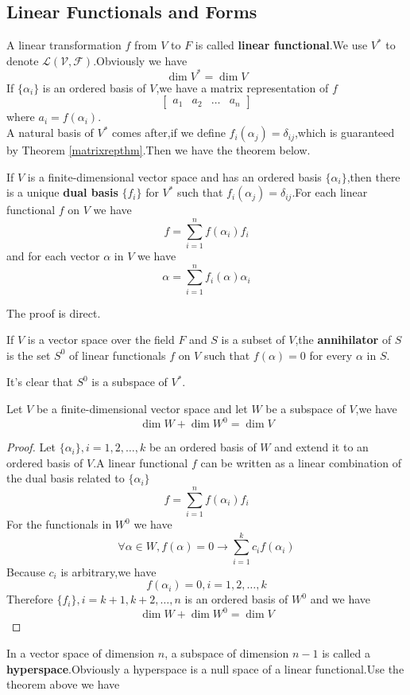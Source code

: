 \documentclass{article}
\begin{document}
\subsection{Linear Functionals and Forms}
A linear transformation $f$ from $V$ to $F$ is called \textbf{linear functional}.We use $V^*$ to denote $\mathcal{L(V,F)}$.Obviously we have
\[\dim V^*=\dim V\]
If $\{\alpha_i\}$ is an ordered basis of $V$,we have a matrix representation of $f$
\[\begin{bmatrix}
	a_1&a_2&\dots&a_n
\end{bmatrix}\]
where $a_i=f(\alpha_i)$.\\
\indent A natural basis of $ V^*$ comes after,if we define $f_i(\alpha_j)=\delta_{ij}$,which is guaranteed by Theorem \ref{matrixrepthm}.Then we have the theorem below.
\begin{thm}
	If $V$ is a finite-dimensional vector space and has an ordered basis $\{\alpha_i\}$,then there is a unique \textbf{dual basis} $\{f_i\}$ for $V^*$ such that $f_i(\alpha_j)=\delta_{ij}$.For each linear functional $f$ on $V$ we have
	\[f=\sum\limits_{i=1}^nf(\alpha_i)f_i\]
	and for each vector $\alpha$ in $V$ we have
	\[\alpha=\sum\limits_{i=1}^nf_i(\alpha)\alpha_i\]
\end{thm}
The proof is direct.
\begin{dde}
	If $V$ is a vector space over the field $F$ and $S$ is a subset of $V$,the \textbf{annihilator} of $S$ is the set $S^0$ of linear functionals $f$ on $V$ such that $f(\alpha)=0$ for every $\alpha$ in $S$.
\end{dde}
It's clear that $S^0$ is a subspace of $V^*$.
\begin{thm}\label{dimfunc}
	Let $V$ be a finite-dimensional vector space and let $W$ be a subspace of $V$,we have
	\[\dim W+\dim W^0=\dim V\]
\end{thm}
\begin{proof}
	Let $\{\alpha_i\},i=1,2,\dots,k$ be an ordered basis of $W$ and extend it to an ordered basis of $V$.A linear functional $f$ can be written as a linear combination of the dual basis related to $\{\alpha_i\}$
	\[f=\sum\limits_{i=1}^nf(\alpha_i)f_i\]
	For the functionals in $W^0$ we have
	\[\forall \alpha \in W,f(\alpha)=0\rightarrow\sum\limits_{i=1}^kc_if(\alpha_i)\]
	Because $c_i$ is arbitrary,we have
	\[f(\alpha_i)=0,i=1,2,\dots,k\]
	Therefore $\{f_i\},i=k+1,k+2,\dots,n$ is an ordered basis of $W^0$ and we have
	\[\dim W+\dim W^0=\dim V\]
\end{proof}
In a vector space of dimension $n$, a subspace of dimension $n-1$ is called a \textbf{hyperspace}.Obviously a hyperspace is a null space of a linear functional.Use the theorem above we have
\end{document}
